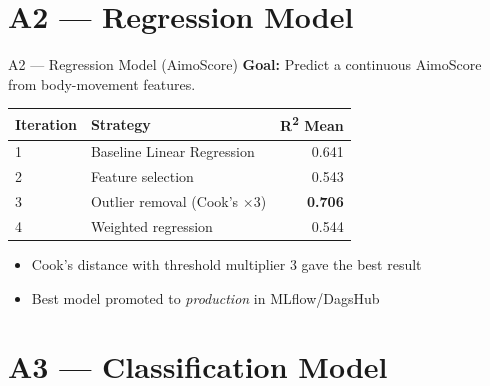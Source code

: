 \documentclass{beamer}
\begin{document}
\section{A2 --- Regression Model}

\begin{frame}{A2 --- Regression Model (AimoScore)}
    \textbf{Goal:} Predict a continuous AimoScore from body-movement features.
    \vspace{0.5em}
    \begin{table}
        \small
        \begin{tabular}{l l r}
            \toprule
            \textbf{Iteration} & \textbf{Strategy} & \textbf{R\textsuperscript{2} Mean} \\
            \midrule
            1 & Baseline Linear Regression   & 0.641 \\
            2 & Feature selection            & 0.543 \\
            3 & Outlier removal (Cook's $\times$3) & \textbf{0.706} \\
            4 & Weighted regression          & 0.544 \\
            \bottomrule
        \end{tabular}
    \end{table}
    \vspace{0.5em}
    \begin{itemize}
        \item Cook's distance with threshold multiplier 3 gave the best result
        \item Best model promoted to \textit{production} in MLflow/DagsHub
    \end{itemize}
\end{frame}

\section{A3 --- Classification Model}
\end{document}
